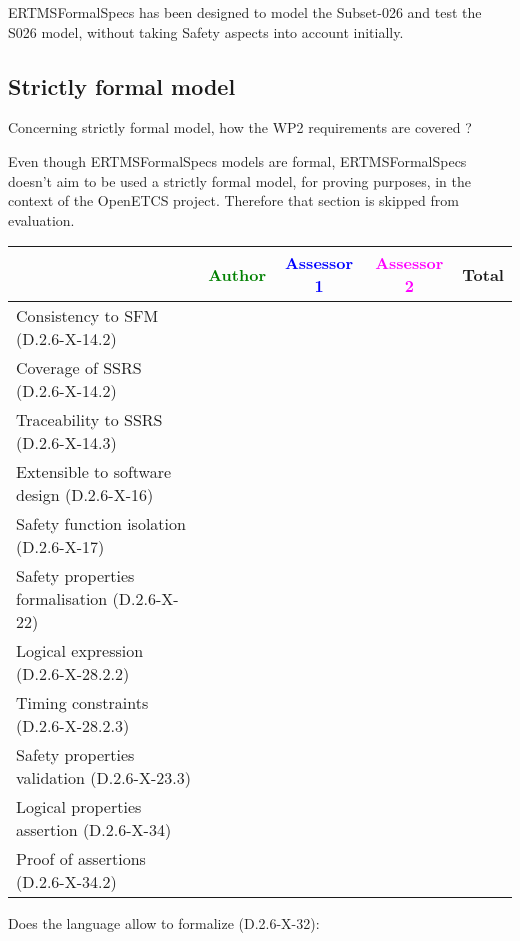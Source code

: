 \begin{author_comment}
\begin{author_comment}
ERTMSFormalSpecs has been designed to model the Subset-026 and test the S026 model, without taking Safety aspects into account initially.    
\end{author_comment}
\subsection{Strictly formal model}

Concerning strictly formal model, how the WP2 requirements are covered ?

\begin{author_comment}
Even though ERTMSFormalSpecs models are formal, ERTMSFormalSpecs doesn't aim to be used a strictly formal model, for proving purposes, in the context of the OpenETCS project. Therefore that section is skipped from evaluation.  
\end{author_comment}

\begin{tabular}{|l | c | c | c | c|}
\hline
& \textcolor{green}{Author} & \textcolor{blue}{Assessor 1} & \textcolor{magenta}{Assessor 2} & Total \\
\hline 
Consistency to SFM (D.2.6-X-14.2) & & & &  \\
\hline
Coverage of SSRS (D.2.6-X-14.2)  & & & &  \\
\hline
Traceability to  SSRS (D.2.6-X-14.3)  & & & &  \\
\hline
Extensible to software design (D.2.6-X-16)  & & & &  \\
\hline
Safety function isolation (D.2.6-X-17)  & & & &  \\
\hline 
Safety properties formalisation (D.2.6-X-22)  & & & &  \\
\hline
Logical expression (D.2.6-X-28.2.2)  & & & &  \\
\hline
Timing constraints (D.2.6-X-28.2.3)  & & & &  \\
\hline
Safety properties validation (D.2.6-X-23.3)  & & & &  \\
\hline
Logical properties assertion (D.2.6-X-34)  & & & &  \\
\hline
Proof of assertions (D.2.6-X-34.2)  & & & &  \\
\hline
\end{tabular}

Does the language allow to  formalize (D.2.6-X-32):


\end{author_comment}
